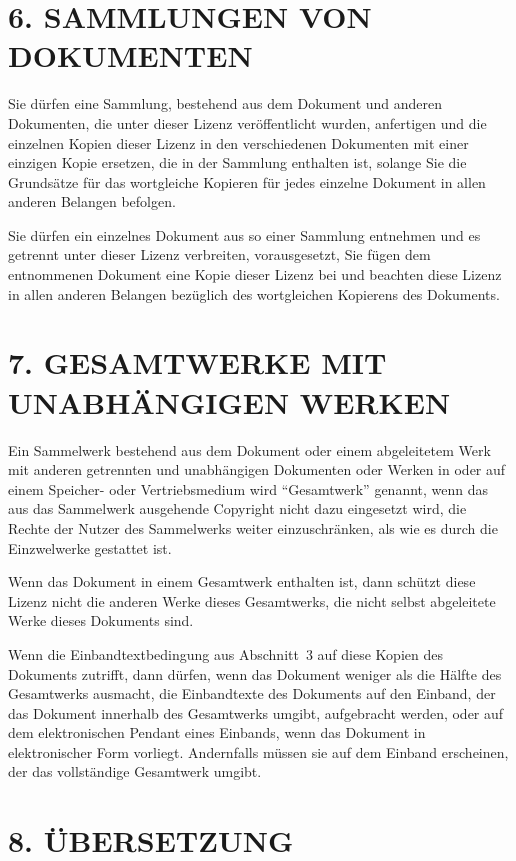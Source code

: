 \section*{6. SAMMLUNGEN VON DOKUMENTEN}

Sie dürfen eine Sammlung, bestehend aus dem Dokument und anderen Dokumenten, die unter dieser Lizenz
veröffentlicht wurden, anfertigen und die einzelnen Kopien dieser Lizenz in den
verschiedenen Dokumenten mit einer einzigen Kopie ersetzen, die in der Sammlung
enthalten ist, solange Sie die Grundsätze für das wortgleiche Kopieren für jedes einzelne Dokument
in allen anderen Belangen befolgen.

Sie dürfen ein einzelnes Dokument aus so einer Sammlung entnehmen und es 
getrennt unter dieser Lizenz verbreiten, vorausgesetzt, Sie fügen dem entnommenen
Dokument eine Kopie dieser Lizenz bei und beachten diese Lizenz in allen anderen
Belangen bezüglich des wortgleichen Kopierens des Dokuments.

\section*{7. GESAMTWERKE MIT UNABHÄNGIGEN WERKEN}

Ein Sammelwerk bestehend aus dem Dokument oder einem abgeleitetem Werk mit anderen getrennten
und unabhängigen Dokumenten oder Werken in oder auf einem Speicher- oder Vertriebsmedium
wird "`Gesamtwerk"' genannt, wenn das aus das Sammelwerk ausgehende Copyright
nicht dazu eingesetzt wird, die Rechte der Nutzer des Sammelwerks weiter einzuschränken,
als wie es durch die Einzwelwerke gestattet ist.

Wenn das Dokument in einem Gesamtwerk enthalten ist, dann schützt diese Lizenz nicht die
anderen Werke dieses Gesamtwerks, die nicht selbst abgeleitete Werke dieses Dokuments sind.

Wenn die Einbandtextbedingung aus Abschnitt~3 auf diese Kopien des Dokuments
zutrifft, dann dürfen, wenn das Dokument weniger als die Hälfte des Gesamtwerks ausmacht,
die Einbandtexte des Dokuments auf den Einband, der das Dokument innerhalb des Gesamtwerks
umgibt, aufgebracht werden, oder auf dem elektronischen Pendant eines Einbands, wenn das
Dokument in elektronischer Form vorliegt. Andernfalls müssen sie auf dem Einband erscheinen,
der das vollständige Gesamtwerk umgibt.

\section*{8. ÜBERSETZUNG}

